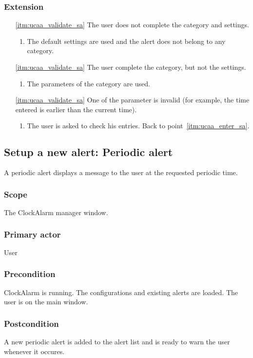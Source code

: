 \subsubsection{Extension}
\begin{enumerate}
	\item[\ref{itm:ucaa_validate_sa}] The user does not complete the category and settings.
	\begin{enumerate}[i]
		\item The default settings are used and the alert does not belong to any category.
	\end{enumerate}
	\item[\ref{itm:ucaa_validate_sa}] The user complete the category, but not the settings.
	\begin{enumerate}[i]
		\item The parameters of the category are used.
	\end{enumerate}
	\item[\ref{itm:ucaa_validate_sa}] One of the parameter is invalid (for example, the time entered is earlier than the current time).
	\begin{enumerate}[i]
		\item The user is asked to check his entries. Back to point~\ref{itm:ucaa_enter_sa}.
	\end{enumerate}
\end{enumerate}

\subsection{Setup a new alert: Periodic alert}\label{subsec:usecase_add_periodic_alert}
A periodic alert displays a message to the user at the requested periodic time.
\subsubsection{Scope}
The ClockAlarm manager window.
\subsubsection{Primary actor}
User
\subsubsection{Precondition}
ClockAlarm is running. The configurations and existing alerts are loaded. The user is on the main window.
\subsubsection{Postcondition}
A new periodic alert is added to the alert list and is ready to warn the user whenever it occures.
